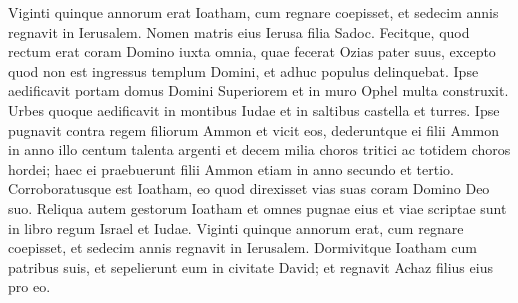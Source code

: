 \begin{biblechapter}
\begin{biblechapter}
\begin{biblechapter}
\begin{biblechapter}
\begin{biblechapter}
\begin{biblechapter}
\begin{biblechapter}
\begin{biblechapter}
\begin{biblechapter}
\begin{biblechapter}
\begin{biblechapter}
\begin{biblechapter}
\begin{biblechapter}
\begin{biblechapter}
\begin{biblechapter}
\begin{biblechapter}
\begin{biblechapter}
\begin{biblechapter}
\begin{biblechapter}
\begin{biblechapter}
\begin{biblechapter}
\begin{biblechapter}
\begin{biblechapter}
\begin{biblechapter}
\begin{biblechapter}
\begin{biblechapter}
\begin{biblechapter}
\verse Viginti quinque annorum erat Ioatham, cum regnare coepisset, et sedecim annis regnavit in Ierusalem. Nomen matris eius Ierusa filia Sadoc. 
\verse Fecitque, quod rectum erat coram Domino iuxta omnia, quae fecerat Ozias pater suus, excepto quod non est ingressus templum Domini, et adhuc populus delinquebat.
 \verse Ipse aedificavit portam domus Domini Superiorem et in muro Ophel multa construxit. 
\verse Urbes quoque aedificavit in montibus Iudae et in saltibus castella et turres. 
\verse Ipse pugnavit contra regem filiorum Ammon et vicit eos, dederuntque ei filii Ammon in anno illo centum talenta argenti et decem milia choros tritici ac totidem choros hordei; haec ei praebuerunt filii Ammon etiam in anno secundo et tertio. 
\verse Corroboratusque est Ioatham, eo quod direxisset vias suas coram Domino Deo suo.
 \verse Reliqua autem gestorum Ioatham et omnes pugnae eius et viae scriptae sunt in libro regum Israel et Iudae. 
\verse Viginti quinque annorum erat, cum regnare coepisset, et sedecim annis regnavit in Ierusalem. 
\verse Dormivitque Ioatham cum patribus suis, et sepelierunt eum in civitate David; et regnavit Achaz filius eius pro eo.
 

\end{biblechapter}
\end{biblechapter}
\end{biblechapter}
\end{biblechapter}
\end{biblechapter}
\end{biblechapter}
\end{biblechapter}
\end{biblechapter}
\end{biblechapter}
\end{biblechapter}
\end{biblechapter}
\end{biblechapter}
\end{biblechapter}
\end{biblechapter}
\end{biblechapter}
\end{biblechapter}
\end{biblechapter}
\end{biblechapter}
\end{biblechapter}
\end{biblechapter}
\end{biblechapter}
\end{biblechapter}
\end{biblechapter}
\end{biblechapter}
\end{biblechapter}
\end{biblechapter}
\end{biblechapter}
